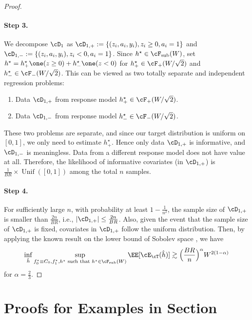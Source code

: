\documentclass[12pt,a4paper,pdftex,onepage]{article}
\begin{document}
\begin{proof}
\paragraph{Step 3. }
We decompose \(\cD_1\) as \(\cD_{1, +} := \{(z_i, a_i, y_i), z_i \geq 0, a_i=1\} \) and \(\cD_{1,-} := \{(z_i, a_i, y_i), z_i < 0, a_i=1\} \).
Since \(h^\star \in \cF_{\operatorname{sub}}(W)\), set \(h^\star = h_+^\star \one(z \geq 0) + h_-^\star \one(z<0)\) for \(h^\star_+ \in \cF_+(W/\sqrt{2})\) and \(h^\star_- \in \cF_-(W/\sqrt{2})\).
This can be viewed as two totally separate and independent regression problems:
\begin{enumerate}
\item Data \(\cD_{1,+}\) from response model \(h^\star_+ \in \cF_+(W/\sqrt{2})\).
\item Data \(\cD_{1,-}\) from response model \(h^\star_- \in \cF_-(W/\sqrt{2})\).
\end{enumerate}
These two problems are separate, and since our target distribution is uniform on \([0,1]\), we only need to estimate \(h^\star_+\).
Hence only data \(\cD_{1,+}\) is informative, and \(\cD_{1,-}\) is meaningless. Data from a different response model does not have value at all.
Therefore, the likelihood of informative covariates (in \(\cD_{1,+}\)) is \(\frac{1}{BR} \times \operatorname{Unif}([0,1])\) among the total \(n\) samples.

\paragraph{Step 4. }
For sufficiently large \(n\), with probability at least \(1- \frac{1}{n^2}\), the sample size of \(\cD_{1,+}\) is smaller than \(\frac{2n}{BR}\), i.e., \(|\cD_{1,+}| \leq \frac{2n}{BR}\).
Also, given the event that the sample size of \(\cD_{1,+}\) is fixed, covariates in \(\cD_{1,+}\) follow the uniform distribution.
Then, by applying the known result on the lower bound of Sobolev space \citep{green2021minimax}, we have 
\begin{align*}
\inf_{\hat{h}} \sup_{f_0^\star \equiv C_0, f_1^\star, h^\star \text{ such that } h^\star \in \cF_{\operatorname{sub}}(W)} \EE[\cE_\cT(\hat{h})] \gtrsim \Bigl(\frac{BR}{n}\Bigr)^{\alpha} W^{2(1-\alpha)}
\end{align*}
for \(\alpha = \frac{2}{3}\).

\end{proof}



\section{Proofs for Examples in Section~}
\label{section; proof weak overlap exampls}
\end{document}
